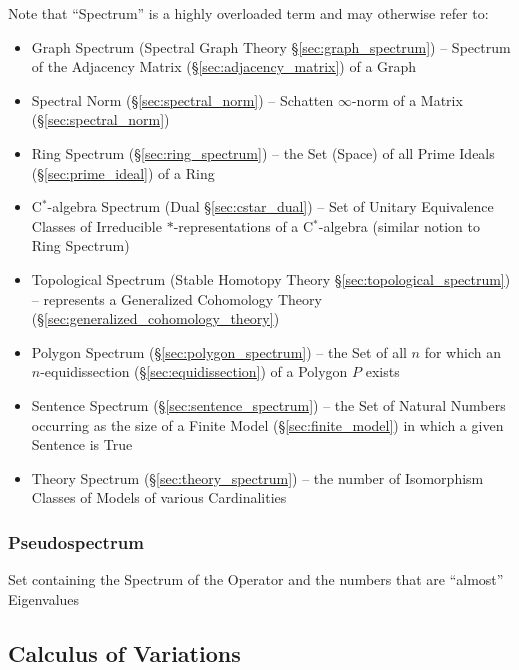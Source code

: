 \fist Note that ``Spectrum'' is a highly overloaded term and may otherwise
refer to:
\begin{itemize}
  \item Graph Spectrum (Spectral Graph Theory \S\ref{sec:graph_spectrum}) --
    Spectrum of the Adjacency Matrix (\S\ref{sec:adjacency_matrix}) of a Graph

  \item Spectral Norm (\S\ref{sec:spectral_norm}) -- Schatten $\infty$-norm of
    a Matrix (\S\ref{sec:spectral_norm})

  \item Ring Spectrum (\S\ref{sec:ring_spectrum}) -- the Set (Space) of all
    Prime Ideals (\S\ref{sec:prime_ideal}) of a Ring
  \item C$^*$-algebra Spectrum (Dual \S\ref{sec:cstar_dual}) -- Set of Unitary
    Equivalence Classes of Irreducible $*$-representations of a C$^*$-algebra
    (similar notion to Ring Spectrum)

  \item Topological Spectrum (Stable Homotopy Theory
    \S\ref{sec:topological_spectrum}) -- represents a Generalized Cohomology
    Theory (\S\ref{sec:generalized_cohomology_theory})

  \item Polygon Spectrum (\S\ref{sec:polygon_spectrum}) -- the Set of all $n$
    for which an $n$-equidissection (\S\ref{sec:equidissection}) of a Polygon
    $P$ exists

  \item Sentence Spectrum (\S\ref{sec:sentence_spectrum}) -- the Set of Natural
    Numbers occurring as the size of a Finite Model
    (\S\ref{sec:finite_model}) in which a given Sentence is True
  \item Theory Spectrum (\S\ref{sec:theory_spectrum}) -- the number of
    Isomorphism Classes of Models of various Cardinalities
\end{itemize}



\subsubsection{Pseudospectrum}\label{sec:pseudospectrum}

Set containing the Spectrum of the Operator and the numbers that are ``almost''
Eigenvalues



\subsection{Calculus of Variations}\label{sec:calculus_of_variations}

